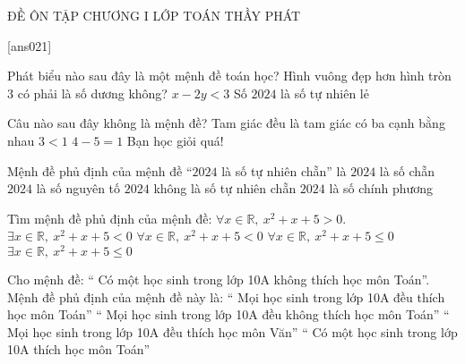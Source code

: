 \begin{name}
	{\tenchude}
	{ĐỀ ÔN TẬP CHƯƠNG I}
	{LỚP TOÁN THẦY PHÁT}
	{\thoigian}
\end{name}
\TN
\setcounter{ex}{0}
[ans021]


\begin{ex}
	Phát biểu nào sau đây là một mệnh đề toán học?
	\choice
	{Hình vuông đẹp hơn hình tròn}
	{$3$ có phải là số dương không?}
	{$x-2y<3$}
	{\True Số $2024$ là số tự nhiên lẻ}
\end{ex}

\begin{ex}
	Câu nào sau đây không là mệnh đề?
	\choice
	{Tam giác đều là tam giác có ba cạnh bằng nhau}
	{$3<1$}
	{$4-5=1$}
	{\True Bạn học giỏi quá!}
\end{ex}

\begin{ex}
	Mệnh đề phủ định của mệnh đề “$2024$ là số tự nhiên chẵn” là
	\choice
	{$2024$ là số chẵn}
	{$2024$ là số nguyên tố}
	{\True $2024$ không là số tự nhiên chẵn}
	{$2024$ là số chính phương}
\end{ex}

\begin{ex}
	Tìm mệnh đề phủ định của mệnh đề: $\forall x\in \mathbb{R}, \ x^2+x+5>0$.
	\choice
	{$\exists x\in \mathbb{R}, \ x^2+x+5<0$}
	{$\forall x\in \mathbb{R}, \ x^2+x+5<0$}
	{$\forall x\in \mathbb{R}, \ x^2+x+5\leqslant 0$}
	{\True $\exists x\in \mathbb{R}, \ x^2+x+5\leqslant 0$}
\end{ex}

\begin{ex}
	Cho mệnh đề: “ Có một học sinh trong lớp 10A không thích học môn Toán”. Mệnh đề phủ định của mệnh đề này là:
	\choice
	{\True “ Mọi học sinh trong lớp 10A đều thích học môn Toán”}
	{“ Mọi học sinh trong lớp 10A đều không thích học môn Toán”}
	{“ Mọi học sinh trong lớp 10A đều thích học môn Văn”}
	{“ Có một học sinh trong lớp 10A thích học môn Toán”}
\end{ex}

